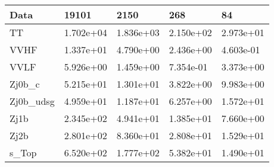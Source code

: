 \begin{table}
{\begin{tabularx}{\textwidth}{|X|X|X|X|X|}
\hline
Data & 19101 & 2150 & 268 & 84 \\
\hline
TT & 1.702e+04 & 1.836e+03 & 2.150e+02 & 2.973e+01 \\
VVHF & 1.337e+01 & 4.790e+00 & 2.436e+00 & 4.603e-01 \\
VVLF & 5.926e+00 & 1.459e+00 & 7.354e-01 & 3.373e+00 \\
Zj0b\_c & 5.215e+01 & 1.301e+01 & 3.822e+00 & 9.983e+00 \\
Zj0b\_udsg & 4.959e+01 & 1.187e+01 & 6.257e+00 & 1.572e+01 \\
Zj1b & 2.345e+02 & 4.941e+01 & 1.385e+01 & 7.660e+00 \\
Zj2b & 2.801e+02 & 8.360e+01 & 2.808e+01 & 1.529e+01 \\
s\_Top & 6.520e+02 & 1.777e+02 & 5.382e+01 & 1.490e+01 \\
\hline
\end{tabularx}
}
\label{tab:cr-Zmm-2016}
\end{table}

